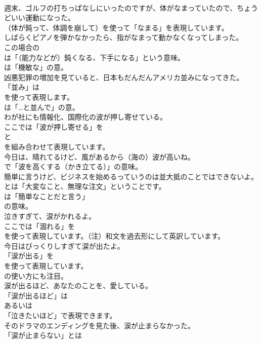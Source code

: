 \documentclass[8pt]{extreport}
\begin{document}
\begin{CJK}{UTF8}{min}
\\	週末、ゴルフの打ちっぱなしにいったのですが、体がなまっていたので、ちょうどいい運動になった。 
\\	（体が鈍って、体調を崩して）を使って「なまる」を表現しています。	
\\	しばらくピアノを弾かなかったら、指がなまって動かなくなってしまった。 
\\	この場合の 
\\	は「（能力などが）鈍くなる、下手になる」という意味。
\\	は「機敏な」の意。	
\\	凶悪犯罪の増加を見ていると、日本もだんだんアメリカ並みになってきた。 
\\	「並み」は
\\	を使って表現します。
\\	は「…と並んで」の意。	
\\	わが社にも情報化、国際化の波が押し寄せている。 
\\	ここでは「波が押し寄せる」を
\\	と
\\	を組み合わせて表現しています。	
\\	今日は、晴れてるけど、風があるから（海の）波が高いね。 
\\	で「波を高くする（かき立てる）」の意味。	
\\	簡単に言うけど、ビジネスを始めるっていうのは並大抵のことではできないよ。 
\\	とは「大変なこと、無理な注文」ということです。
\\	は「簡単なことだと言う」
\\	の意味。	
\\	泣きすぎて、涙がかれるよ。 
\\	ここでは「涸れる」を 
\\	を使って表現しています。（注）和文を過去形にして英訳しています。	
\\	今日はびっくりしすぎて涙が出たよ。 
\\	「涙が出る」を 
\\	を使って表現しています。
\\	の使い方にも注目。	
\\	涙が出るほど、あなたのことを、愛している。 
\\	「涙が出るほど」は
\\	あるいは
\\	「泣きたいほど」で表現できます。	
\\	そのドラマのエンディングを見た後、涙が止まらなかった。 
\\	「涙が止まらない」とは

\end{CJK}
\end{document}
